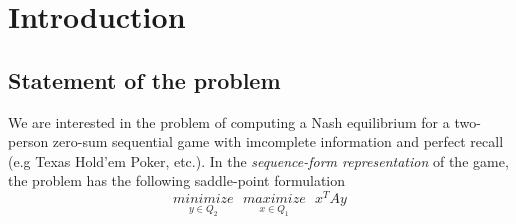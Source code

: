 \documentclass[a4paper,9pt,journal]{IEEEtran}
\begin{document}
\section{Introduction}


\subsection{Statement of the problem}
We are interested in the problem of computing a Nash equilibrium for a two-person zero-sum sequential game with imcomplete information
and perfect recall (e.g Texas Hold'em Poker, etc.). In the \textit{sequence-form representation} of the game, the problem has the following saddle-point formulation
\begin{equation}
  \underset{y \in Q_2}{minimize}\text{ }\underset{x \in Q_1}{maximize}\text{ }{x^TAy}
  \label{eq:opt_pb}
\end{equation}
\end{document}
